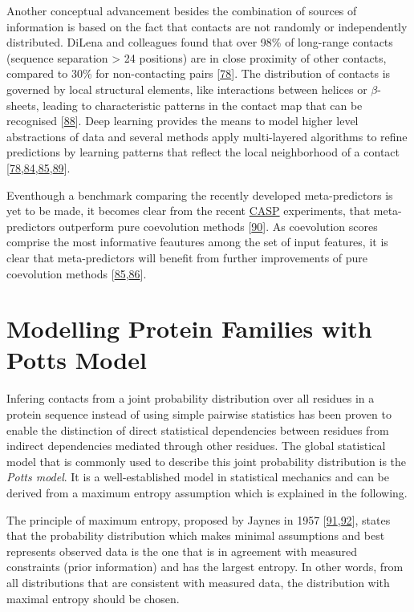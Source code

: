 \documentclass[11pt,a4paper,twoside]{book}
\theoremstyle{definition}
\theoremstyle{definition}
\theoremstyle{remark}
\begin{document}
Another conceptual advancement besides the combination of sources of
information is based on the fact that contacts are not randomly or
independently distributed. DiLena and colleagues found that over 98\% of
long-range contacts (sequence separation \textgreater{} 24 positions)
are in close proximity of other contacts, compared to 30\% for
non-contacting pairs {[}\protect\hyperlink{ref-DiLena2012a}{78}{]}. The
distribution of contacts is governed by local structural elements, like
interactions between helices or \(\beta\)-sheets, leading to
characteristic patterns in the contact map that can be recognised
{[}\protect\hyperlink{ref-Andreani2015a}{88}{]}. Deep learning provides
the means to model higher level abstractions of data and several methods
apply multi-layered algorithms to refine predictions by learning
patterns that reflect the local neighborhood of a contact
{[}\protect\hyperlink{ref-DiLena2012a}{78},\protect\hyperlink{ref-Jones2015a}{84},\protect\hyperlink{ref-Wang2016a}{85},\protect\hyperlink{ref-Skwark2014a}{89}{]}.

Eventhough a benchmark comparing the recently developed meta-predictors
is yet to be made, it becomes clear from the recent
\protect\hyperlink{abbrev}{CASP} experiments, that meta-predictors
outperform pure coevolution methods
{[}\protect\hyperlink{ref-Monastyrskyy2015}{90}{]}. As coevolution
scores comprise the most informative feautures among the set of input
features, it is clear that meta-predictors will benefit from further
improvements of pure coevolution methods
{[}\protect\hyperlink{ref-Wang2016a}{85},\protect\hyperlink{ref-Stahl2017}{86}{]}.

\section{Modelling Protein Families with Potts Model}\label{maxent}

Infering contacts from a joint probability distribution over all
residues in a protein sequence instead of using simple pairwise
statistics has been proven to enable the distinction of direct
statistical dependencies between residues from indirect dependencies
mediated through other residues. The global statistical model that is
commonly used to describe this joint probability distribution is the
\emph{Potts model}. It is a well-established model in statistical
mechanics and can be derived from a maximum entropy assumption which is
explained in the following.

The principle of maximum entropy, proposed by Jaynes in 1957
{[}\protect\hyperlink{ref-Jaynes1957a}{91},\protect\hyperlink{ref-Jaynes1957b}{92}{]},
states that the probability distribution which makes minimal assumptions
and best represents observed data is the one that is in agreement with
measured constraints (prior information) and has the largest entropy. In
other words, from all distributions that are consistent with measured
data, the distribution with maximal entropy should be chosen.
\end{document}
